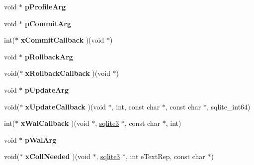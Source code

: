 \begin{DoxyCompactItemize}
\item 
\hypertarget{structsqlite3_a931c234df9b701c78de38ddf22869062}{void $\ast$ {\bfseries p\-Profile\-Arg}}\label{structsqlite3_a931c234df9b701c78de38ddf22869062}

\item 
\hypertarget{structsqlite3_a355237725d3a535d702815b6ef8be75e}{void $\ast$ {\bfseries p\-Commit\-Arg}}\label{structsqlite3_a355237725d3a535d702815b6ef8be75e}

\item 
\hypertarget{structsqlite3_a1b12d797fb7f9c526ffb6665a7f42203}{int($\ast$ {\bfseries x\-Commit\-Callback} )(void $\ast$)}\label{structsqlite3_a1b12d797fb7f9c526ffb6665a7f42203}

\item 
\hypertarget{structsqlite3_a3215967241f15d4599132a8dc2adfb93}{void $\ast$ {\bfseries p\-Rollback\-Arg}}\label{structsqlite3_a3215967241f15d4599132a8dc2adfb93}

\item 
\hypertarget{structsqlite3_ad09cbc96e3c4e322c1722b8c16b9cf24}{void($\ast$ {\bfseries x\-Rollback\-Callback} )(void $\ast$)}\label{structsqlite3_ad09cbc96e3c4e322c1722b8c16b9cf24}

\item 
\hypertarget{structsqlite3_ab4269aa44fea9906fe94045336f13d2a}{void $\ast$ {\bfseries p\-Update\-Arg}}\label{structsqlite3_ab4269aa44fea9906fe94045336f13d2a}

\item 
\hypertarget{structsqlite3_a9177ce33e670ba38c97046e21482414a}{void($\ast$ {\bfseries x\-Update\-Callback} )(void $\ast$, int, const char $\ast$, const char $\ast$, sqlite\-\_\-int64)}\label{structsqlite3_a9177ce33e670ba38c97046e21482414a}

\item 
\hypertarget{structsqlite3_a895ca1f1d541060f1a43ac0267ab6437}{int($\ast$ {\bfseries x\-Wal\-Callback} )(void $\ast$, \hyperlink{structsqlite3}{sqlite3} $\ast$, const char $\ast$, int)}\label{structsqlite3_a895ca1f1d541060f1a43ac0267ab6437}

\item 
\hypertarget{structsqlite3_aa75309c2e522cf0f6ccbd7a3c38e1075}{void $\ast$ {\bfseries p\-Wal\-Arg}}\label{structsqlite3_aa75309c2e522cf0f6ccbd7a3c38e1075}

\item 
\hypertarget{structsqlite3_ac43395ff160433e9811951232b1f6e63}{void($\ast$ {\bfseries x\-Coll\-Needed} )(void $\ast$, \hyperlink{structsqlite3}{sqlite3} $\ast$, int e\-Text\-Rep, const char $\ast$)}\label{structsqlite3_ac43395ff160433e9811951232b1f6e63}


\end{DoxyCompactItemize}
